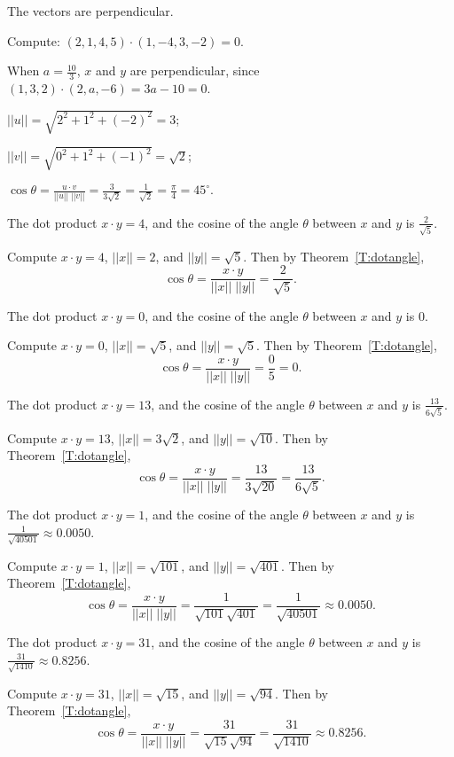  \ans The vectors are perpendicular.

\soln Compute: $(2,1,4,5) \cdot (1,-4,3,-2) = 0$.

When $a = \frac{10}{3}$, $x$ and $y$ are perpendicular, since
$(1,3,2) \cdot (2,a,-6) = 3a - 10 = 0$.

$||u||  =  \sqrt{2^2 + 1^2 + (-2)^2}  =  3$;

$||v||  =  \sqrt{0^2 + 1^2 + (-1)^2}  =  \sqrt{2}$;

$
\cos \theta = \frac{u \cdot v}{||u||\;||v||}  =  \frac{3}{3\sqrt{2}} =
\frac{1}{\sqrt{2}} = \frac{\pi}{4} = 45^\circ.
$

 \ans The dot product $x \cdot y = 4$, and the cosine
of the angle $\theta$ between $x$ and $y$ is $\frac{2}{\sqrt{5}}$.

\soln Compute $x \cdot y = 4$, $||x|| = 2$, and $||y|| = \sqrt{5}$.
Then by Theorem~\ref{T:dotangle},
\[
\cos\theta = \frac{x \cdot y}{||x||\;||y||} = \frac{2}{\sqrt{5}}.
\]

 \ans The dot product $x \cdot y = 0$, and the cosine
of the angle $\theta$ between $x$ and $y$ is $0$.

\soln Compute $x \cdot y = 0$, $||x|| = \sqrt{5}$, and $||y|| = \sqrt{5}$.
Then by Theorem~\ref{T:dotangle},
\[
\cos\theta = \frac{x \cdot y}{||x||\;||y||} = \frac{0}{5}
= 0.
\]

 \ans The dot product $x \cdot y = 13$, and the cosine
of the angle $\theta$ between $x$ and $y$ is $\frac{13}{6\sqrt{5}}$.

\soln Compute $x \cdot y = 13$, $||x|| = 3\sqrt{2}$, and $||y|| = \sqrt{10}$.
Then by Theorem~\ref{T:dotangle},
\[
\cos\theta = \frac{x \cdot y}{||x||\;||y||} = \frac{13}{3\sqrt{20}}
= \frac{13}{6\sqrt{5}}.
\]

 \ans The dot product $x \cdot y = 1$, and the cosine
of the angle $\theta$ between $x$ and $y$ is
$\frac{1}{\sqrt{40501}} \approx 0.0050$.

\soln Compute $x \cdot y = 1$, $||x|| = \sqrt{101}$, and $||y|| = \sqrt{401}$.
Then by Theorem~\ref{T:dotangle},
\[
\cos\theta = \frac{x \cdot y}{||x||\;||y||} = \frac{1}{\sqrt{101}\sqrt{401}}
= \frac{1}{\sqrt{40501}} \approx 0.0050.
\]

 \ans The dot product $x \cdot y = 31$, and the cosine
of the angle $\theta$ between $x$ and $y$ is
$\frac{31}{\sqrt{1410}} \approx 0.8256$.

\soln Compute $x \cdot y = 31$, $||x|| = \sqrt{15}$, and $||y|| = \sqrt{94}$.
Then by Theorem~\ref{T:dotangle},
\[
\cos\theta = \frac{x \cdot y}{||x||\;||y||} = \frac{31}{\sqrt{15}\sqrt{94}}
= \frac{31}{\sqrt{1410}} \approx 0.8256.
\]

